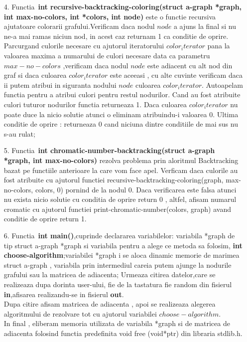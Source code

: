 \documentclass[12pt]{article}
\begin{document}
\begin{enumerate}
  \item [4.]Functia\ {\bf int recursive-backtracking-coloring(struct a-graph *graph, int max-no-colors, int *colors, int node)} este o functie recursiva ajutatoare colorarii grafului.Verificam daca nodul $node$ a ajuns la final si nu ne-a mai ramas niciun nod, in acest caz returnam 1 ca conditie de oprire. Parcurgand culorile necesare cu ajutorul iteratorului $color_iterator$ pana la valoarea maxima a numarului de culori necesare data ca parametru $max-no-colors$ ,verificam daca nodul $node$ este adiacent cu alt nod din graf si daca culoarea $color_iterator$ este aceeasi , cu alte cuvinte verificam daca ii putem atribui in siguranta nodului $node$ culoarea $color_iterator$. Autoapelam functia pentru a atribui culori pentru restul nodurilor. Cand au fost atribuite culori tuturor nodurilor functia returneaza 1.
  Daca culoarea $color_iterator$ nu poate duce la nicio solutie atunci o eliminam atribuindu-i valoarea 0.
  Ultima conditie de oprire : returneaza 0 cand niciuna dintre conditiile de mai sus nu s-au rulat;
  
  \item [5.]Functia\ {\bf int chromatic-number-backtracking(struct a-graph *graph, int max-no-colors)} rezolva problema prin aloritmul Backtracking bazat pe functiile anterioare la care vom face apel.
  Verficam daca culorile au fost atribuite cu ajutorul functiei recursive-backtracking-coloring(graph, max-no-colors, colors, 0) pornind de la nodul 0. Daca verificarea este falsa atunci nu exista nicio solutie cu conditia de oprire return 0 , altfel, afisam numarul cromatic cu ajutorul functiei print-chromatic-number(colors, graph) avand conditie de oprire return 1.
  
  \item [6.]Functia\ {\bf int main()},cuprinde declararea variabilelor: variabila *graph de tip struct a-graph *graph si variabila pentru a alege ce metoda sa folosim, {\bf int choose-algorithm};variabilei *graph i se aloca dinamic memorie de marimea struct a-graph , variabila prin intermediul careia putem ajunge la nodurile grafului sau la matricea de adiacenta; Urmeaza citirea datelor,care se realizeaza dupa dorinta user-ului, fie de la tastatura fie random din fisierul {\bf in},afisarea realizandu-se in fisierul {\bf out}.\\
  Dupa citire afisam matricea de adiacenta , apoi se realizeaza alegerea algoritmului de rezolvare tot cu ajutorul variabilei $choose-algorithm$. \\
  In final , eliberam memoria utilizata de variabila *graph si de matricea de adiacenta folosind functia predeﬁnita void free (void*ptr) din libraria stdlib.h.

\end{enumerate}
\pagebreak
\end{document}

